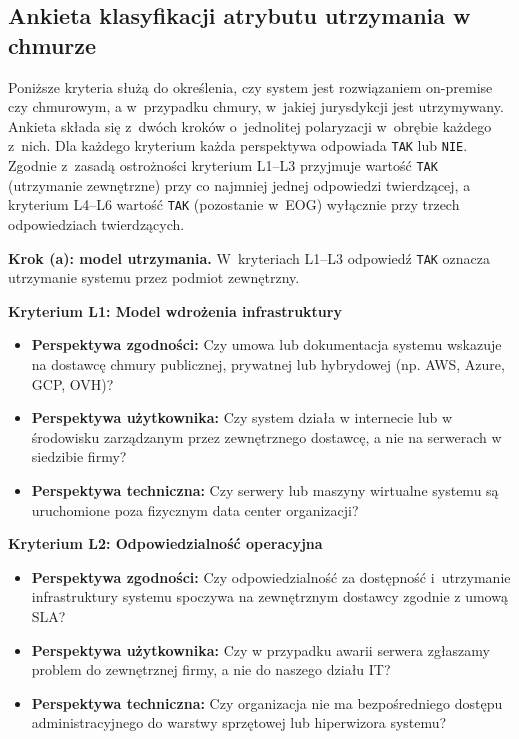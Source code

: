 \subsection{Ankieta klasyfikacji atrybutu utrzymania w chmurze}
\label{sec:ankieta-chmura}
Poniższe kryteria służą do określenia, czy system jest rozwiązaniem on-premise czy chmurowym, a w~przypadku chmury, w~jakiej jurysdykcji jest utrzymywany. Ankieta składa się z~dwóch kroków o~jednolitej polaryzacji w~obrębie każdego z~nich. Dla każdego kryterium każda perspektywa odpowiada \texttt{TAK} lub \texttt{NIE}. Zgodnie z~zasadą ostrożności kryterium L1--L3 przyjmuje wartość \texttt{TAK} (utrzymanie zewnętrzne) przy co najmniej jednej odpowiedzi twierdzącej, a kryterium L4--L6 wartość \texttt{TAK} (pozostanie w~EOG) wyłącznie przy trzech odpowiedziach twierdzących.

\bigskip

\noindent\textbf{Krok (a): model utrzymania.} W~kryteriach L1--L3 odpowiedź \texttt{TAK} oznacza utrzymanie systemu przez podmiot zewnętrzny.

\bigskip

\textbf{Kryterium L1: Model wdrożenia infrastruktury}

\begin{itemize}
\item \textbf{Perspektywa zgodności:} Czy umowa lub dokumentacja systemu wskazuje na dostawcę chmury publicznej, prywatnej lub hybrydowej (np. AWS, Azure, GCP, OVH)?
\item \textbf{Perspektywa użytkownika:} Czy system działa w internecie lub w środowisku zarządzanym przez zewnętrznego dostawcę, a nie na serwerach w siedzibie firmy?
\item \textbf{Perspektywa techniczna:} Czy serwery lub maszyny wirtualne systemu są uruchomione poza fizycznym data center organizacji?
\end{itemize}


\textbf{Kryterium L2: Odpowiedzialność operacyjna}

\begin{itemize}
\item \textbf{Perspektywa zgodności:} Czy odpowiedzialność za dostępność i~utrzymanie infrastruktury systemu spoczywa na zewnętrznym dostawcy zgodnie z umową SLA?
\item \textbf{Perspektywa użytkownika:} Czy w przypadku awarii serwera zgłaszamy problem do zewnętrznej firmy, a nie do naszego działu IT?
\item \textbf{Perspektywa techniczna:} Czy organizacja nie ma bezpośredniego dostępu administracyjnego do warstwy sprzętowej lub hiperwizora systemu?
\end{itemize}

